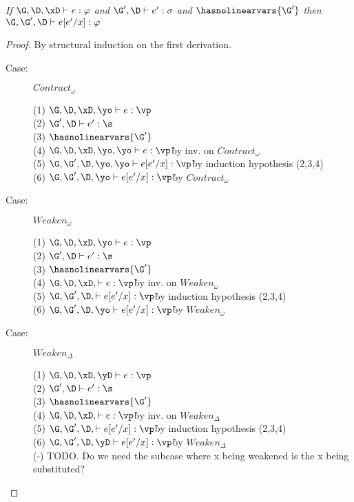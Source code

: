 
\begin{lemma}
\emph{If $\G, \D, \xD \vdash e : \varphi$ and $\G', \D \vdash e' : \sigma$ and $\hasnolinearvars{\G'}$
        then $\G, \G', \D \vdash e[e'/x] : \varphi$}
\end{lemma}
\begin{proof}
By structural induction on the first derivation.

\begin{description}

\item[Case:] $Contract_\omega$
\begin{tabbing}
    (1) $\G, \D, \xD, \yo \vdash e : \vp$\\
    (2) $\G', \D \vdash e' : \s$\\
    (3) $\hasnolinearvars{\G'}$\\
    (4) $\G, \D, \xD, \yo, \yo \vdash e : \vp$\` by inv. on $Contract_\omega$\\
    (5) $\G, \G', \D, \yo, \yo \vdash e[e'/x] : \vp$\` by induction hypothesis (2,3,4)\\
    (6) $\G, \G', \D, \yo \vdash e[e'/x] : \vp$\` by $Contract_\omega$\\
\end{tabbing}

\item[Case:] $Weaken_\omega$
\begin{tabbing}
    (1) $\G, \D, \xD, \yo \vdash e : \vp$\\
    (2) $\G', \D \vdash e' : \s$\\
    (3) $\hasnolinearvars{\G'}$\\
    (4) $\G, \D, \xD, \vdash e : \vp$\` by inv. on $Weaken_\omega$\\
    (5) $\G, \G', \D, \vdash e[e'/x] : \vp$\` by induction hypothesis (2,3,4)\\
    (6) $\G, \G', \D, \yo \vdash e[e'/x] : \vp$\` by $Weaken_\omega$\\
\end{tabbing}

\item[Case:] $Weaken_\Delta$
\begin{tabbing}
    (1) $\G, \D, \xD, \yD \vdash e : \vp$\\
    (2) $\G', \D \vdash e' : \s$\\
    (3) $\hasnolinearvars{\G'}$\\
    (4) $\G, \D, \xD, \vdash e : \vp$\` by inv. on $Weaken_\Delta$\\
    (5) $\G, \G', \D, \vdash e[e'/x] : \vp$\` by induction hypothesis (2,3,4)\\
    (6) $\G, \G', \D, \yD \vdash e[e'/x] : \vp$\` by $Weaken_\Delta$\\
    (-) TODO. Do we need the subcase where x being weakened is the x being
    substituted?\\
\end{tabbing}


\end{description}
\end{proof}
